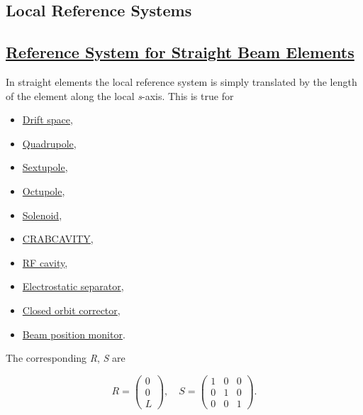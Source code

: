 




\subsection{Local Reference Systems}

\subsection{\href{straight}{Reference System for Straight Beam Elements}} In straight elements the local reference system is simply translated by the length of the element along the local \textit{s}-axis. This is true for 
\begin{itemize}
	\item \href{drift.html}{Drift space}, 
	\item \href{quadrupole.html}{Quadrupole}, 
	\item \href{sextupole.html}{Sextupole}, 
	\item \href{octupole.html}{Octupole}, 
	\item \href{solenoid.html}{Solenoid}, 
	\item \href{crabcavity.html}{CRABCAVITY}, 
	\item \href{cavity.html}{RF cavity}, 
	\item \href{separator.html}{Electrostatic separator}, 
	\item \href{kickers.html}{Closed orbit corrector}, 
	\item \href{monitors.html}{Beam position monitor}. 
\end{itemize} The corresponding \textit{R}, \textit{S} are 


\[
R =
 \begin{pmatrix}
  0 \\
  0 \\
  L
 \end{pmatrix}
, \quad
S =
 \begin{pmatrix}
  1 & 0 &  0 \\
  0 & 1 &  0 \\
  0 & 0 &  1
 \end{pmatrix}
.
\]

